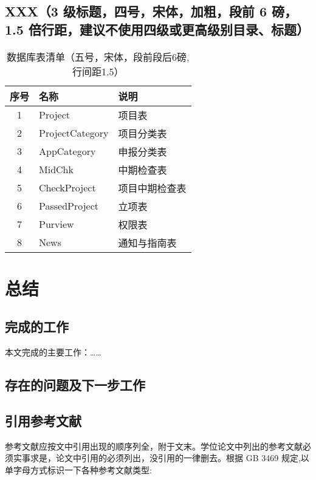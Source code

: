 \section{XXX（3 级标题，四号，宋体，加粗，段前 6 磅，1.5 倍行距，建议不使用四级或更高级别目录、标题）}
\begin{table}[!htbp]
  \centering
  \caption{数据库表清单（五号，宋体，段前段后6磅,行间距1.5）}
  \label{fig:list}
  \begin{tabular}{cll}
    \toprule  %
    \textbf{序号} & \textbf{名称}   & \textbf{说明}  \\
    \midrule  %
    1             & Project         & 项目表         \\
    2             & ProjectCategory & 项目分类表     \\
    3             & AppCategory     & 申报分类表     \\
    4             & MidChk          & 中期检查表     \\
    5             & CheckProject    & 项目中期检查表 \\
    6             & PassedProject   & 立项表         \\
    7             & Purview         & 权限表         \\
    8             & News            & 通知与指南表   \\
    \bottomrule %
  \end{tabular}
\end{table}

\chapter{总结}
\section{完成的工作}
本文完成的主要工作：……

\section{存在的问题及下一步工作}
\section{引用参考文献}

参考文献应按文中引用出现的顺序列全，附于文末。学位论文中列出的参考文献必须实事求是，论文中引用的必须列出，没引用的一律删去。根据 GB 3469 规定,以单字母方式标识一下各种参考文献类型:

